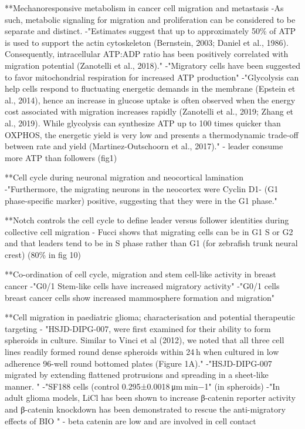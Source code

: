 \documentclass[11pt,a4paper]{article}
\begin{document}
**Mechanoresponsive metabolism in cancer cell migration and metastasis
-As such, metabolic signaling for migration and proliferation can be considered to be separate and distinct.
-"Estimates suggest that up to approximately 50\% of ATP is used to support the actin cytoskeleton (Bernstein, 2003; Daniel et al., 1986). Consequently, intracellular ATP:ADP ratio has been positively correlated with migration potential (Zanotelli et al., 2018)."
-"Migratory cells have been suggested to favor mitochondrial respiration for increased ATP production"
-"Glycolysis can help cells respond to fluctuating energetic demands in the membrane (Epstein et al., 2014), hence an increase in glucose uptake is often observed when the energy cost associated with migration increases rapidly (Zanotelli et al., 2019; Zhang et al., 2019). While glycolysis can synthesize ATP up to 100 times quicker than OXPHOS, the energetic yield is very low and presents a thermodynamic trade-off between rate and yield (Martinez-Outschoorn et al., 2017)."
- leader consume more ATP than followers (fig1)

**Cell cycle during neuronal migration and neocortical lamination \\
-"Furthermore, the migrating neurons in the neocortex were Cyclin D1- (G1 phase-specific marker) positive, suggesting that they were in the G1 phase."

**Notch controls the cell cycle to define leader versus follower identities during collective cell migration
- Fucci shows that migrating cells can be in G1 S or G2 and that leaders tend to be in S phase rather than G1 (for zebrafish trunk neural crest) (80\% in fig 10)


**Co-ordination of cell cycle, migration and stem cell-like activity in breast cancer
-"G0/1 Stem-like cells have increased migratory activity"
-"G0/1 cells breast cancer cells show increased mammosphere formation and migration"

**Cell migration in paediatric glioma; characterisation and potential therapeutic targeting
- "HSJD-DIPG-007, were first examined for their ability to form spheroids in culture. Similar to Vinci et al (2012), we noted that all three cell lines readily formed round dense spheroids within 24 h when cultured in low adherence 96-well round bottomed plates (Figure 1A)."
-"HSJD-DIPG-007 migrated by extending flattened protrusions and spreading in a sheet-like manner. "
-"SF188 cells (control 0.295±0.0018 μm min−1" (in spheroids)
-"In adult glioma models, LiCl has been shown to increase β-catenin reporter activity and β-catenin knockdown has been demonstrated to rescue the anti-migratory effects of BIO "
- beta catenin are low and are involved in cell contact
\end{document}
